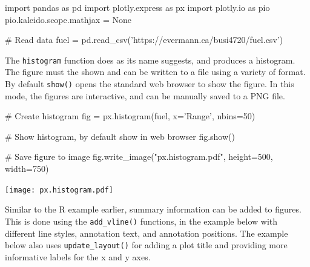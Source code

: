 \begin{samepage}
\begin{pythoncode}
import pandas as pd
import plotly.express as px
import plotly.io as pio
pio.kaleido.scope.mathjax = None

# Read data
fuel = pd.read_csv('https://evermann.ca/busi4720/fuel.csv')
\end{pythoncode}
\end{samepage}

\noindent The \texttt{histogram} function does as its name suggests, and produces a histogram. The figure must the shown and can be written to a file using a variety of format. By default \texttt{show()} opens the standard web browser to show the figure. In this mode, the figures are interactive, and can be manually saved to a PNG file.

\begin{samepage}
\begin{pythoncode}
# Create histogram
fig = px.histogram(fuel, x='Range', nbins=50)

# Show histogram, by default show in web browser
fig.show()

# Save figure to image
fig.write_image("px.histogram.pdf", height=500, width=750)
\end{pythoncode}
\end{samepage}

\begin{center}
    \texttt{[image: px.histogram.pdf]}
\end{center}

Similar to the R example earlier, summary information can be added to figures. This is done using the \texttt{add\_vline()} functions, in the example below with different line styles, annotation text, and annotation positions. The example below also uses \texttt{update\_layout()} for adding a plot title and providing more informative labels for the x and y axes.

